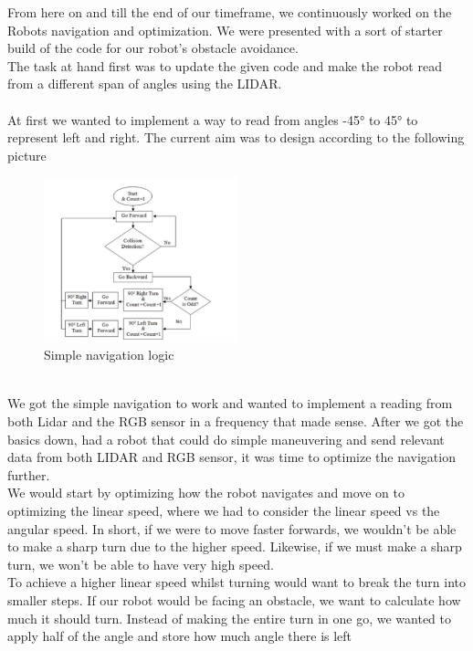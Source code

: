 \documentclass[conference]{IEEEtran}
\begin{document}
From here on and till the end of our timeframe, we continuously worked on the Robots navigation and optimization.
We were presented with a sort of starter build of the code \cite{b5} for our robot's obstacle avoidance.\\
The task at hand first was to update the given code and make the robot read from a different 
span of angles using the LIDAR. \\
\vspace*{2pt}\\
At first we wanted to implement a way to read from angles -45° to 45° to 
represent left and right. The current aim was to design according to the following picture\cite{b6}
\begin{figure}[h] %
    \centering
    \includegraphics[width=0.5\textwidth]{initialNav.png}
    \caption{Simple navigation logic}
\end{figure} \\
We got the simple navigation to work and wanted to implement a reading from both Lidar and the RGB sensor 
in a frequency that made sense. After we got the basics down, had a robot that could do simple maneuvering 
and send relevant data from both LIDAR and RGB sensor, it was time to optimize the navigation further.\\
We would start by optimizing how the robot navigates and move on to optimizing the linear speed, where we had 
to consider the linear speed vs the angular speed. In short, if we were to move faster forwards, we wouldn't be 
able to make a sharp turn due to the higher speed. Likewise, if we must make a sharp turn, we won't be able to have 
very high speed.\\
To achieve a higher linear speed whilst turning would want to break the turn into smaller steps. 
If our robot would be facing an obstacle, we want to calculate how much it should turn. Instead of making 
the entire turn in one go, we wanted to apply half of the angle and store how much angle there is left 
\end{document}

